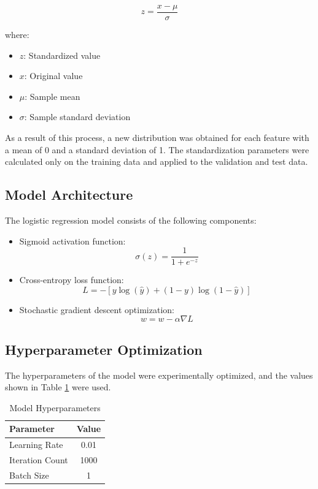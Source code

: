 \documentclass[conference]{IEEEtran}
\begin{document}
\begin{equation}
z = \frac{x - \mu}{\sigma}
\end{equation}

where:
\begin{itemize}
\item $z$: Standardized value
\item $x$: Original value
\item $\mu$: Sample mean
\item $\sigma$: Sample standard deviation
\end{itemize}

As a result of this process, a new distribution was obtained for each feature
with a mean of 0 and a standard deviation of 1. The standardization parameters
were calculated only on the training data and applied to the validation and test
data.

\subsection{Model Architecture}
The logistic regression model consists of the following components:
\begin{itemize}
\item Sigmoid activation function:
\begin{equation}
\sigma(z) = \frac{1}{1 + e^{-z}}
\end{equation}
\item Cross-entropy loss function:
\begin{equation}
L = -[y\log(\hat{y}) + (1-y)\log(1-\hat{y})]
\end{equation}
\item Stochastic gradient descent optimization:
\begin{equation}
w = w - \alpha\nabla L
\end{equation}
\end{itemize}

\subsection{Hyperparameter Optimization}

The hyperparameters of the model were experimentally optimized, and the values
shown in Table \ref{tab:hyperparameters} were used.

\begin{table}[!t]
\caption{Model Hyperparameters}
\label{tab:hyperparameters}
\centering
\begin{tabular}{|l|c|}
\hline
\textbf{Parameter} & \textbf{Value} \\
\hline
Learning Rate & 0.01 \\
Iteration Count & 1000 \\
Batch Size & 1 \\
\hline
\end{tabular}
\end{table}
\end{document}
